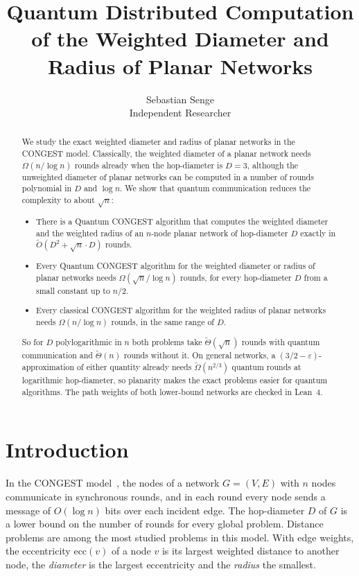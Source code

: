 \documentclass[11pt]{article}
\title{Quantum Distributed Computation of the Weighted Diameter and Radius of Planar Networks}
\author{Sebastian Senge\\ Independent Researcher}
\date{}
\theoremstyle{definition}
\theoremstyle{remark}
\newcommand{\ecc}{\mathrm{ecc}}
\newcommand{\Ot}{\tilde O}
\begin{document}
\maketitle

\begin{abstract}
We study the exact weighted diameter and radius of planar networks in the CONGEST model. Classically, the weighted diameter of a planar network needs $\Omega(n/\log n)$ rounds already when the hop-diameter is $D = 3$, although the unweighted diameter of planar networks can be computed in a number of rounds polynomial in $D$ and $\log n$. We show that quantum communication reduces the complexity to about $\sqrt n$:
\begin{itemize}[leftmargin=1.5em]
\item There is a Quantum CONGEST algorithm that computes the weighted diameter and the weighted radius of an $n$-node planar network of hop-diameter $D$ exactly in $\Ot(D^2+\sqrt n \cdot D)$ rounds.
\item Every Quantum CONGEST algorithm for the weighted diameter or radius of planar networks needs $\Omega(\sqrt n/\log n)$ rounds, for every hop-diameter $D$ from a small constant up to $n/2$.
\item Every classical CONGEST algorithm for the weighted radius of planar networks needs $\Omega(n/\log n)$ rounds, in the same range of $D$.
\end{itemize}
So for $D$ polylogarithmic in $n$ both problems take $\tilde\Theta(\sqrt n)$ rounds with quantum communication and $\tilde\Theta(n)$ rounds without it. On general networks, a $(3/2-\varepsilon)$-approximation of either quantity already needs $\tilde\Omega(n^{2/3})$ quantum rounds at logarithmic hop-diameter, so planarity makes the exact problems easier for quantum algorithms. The path weights of both lower-bound networks are checked in Lean~4.
\end{abstract}

\section{Introduction}

In the CONGEST model~\cite{Pel00}, the nodes of a network $G=(V,E)$ with $n$ nodes communicate in synchronous rounds, and in each round every node sends a message of $O(\log n)$ bits over each incident edge. The hop-diameter $D$ of $G$ is a lower bound on the number of rounds for every global problem. Distance problems are among the most studied problems in this model. With edge weights, the eccentricity $\ecc(v)$ of a node $v$ is its largest weighted distance to another node, the \emph{diameter} is the largest eccentricity and the \emph{radius} the smallest.
\end{document}
